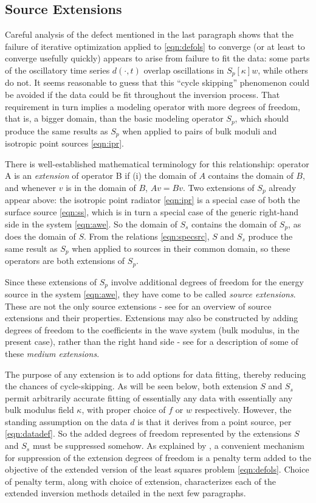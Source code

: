 \subsection{Source Extensions}

Careful analysis of the defect mentioned in the last paragraph shows
that the failure of iterative optimization applied to \ref{eqn:defols}
to converge (or at least to converge usefully quickly) appears to
arise from failure to fit the data: some parts of the oscillatory time
series $d(\cdot,t)$ overlap oscillations in $S_p[\kappa]w$, while
others do not. It seems reasonable to guess that this ``cycle skipping'' phenomenon 
could be avoided if the data could be fit throughout the inversion
process. That requirement in turn implies a modeling operator with
more degrees of freedom, that is, a bigger domain, than the basic
modeling operator $S_p$, which should produce the same results as
$S_p$ when applied to pairs of bulk moduli and isotropic point sources \ref{eqn:ipr}.

There is
well-established mathematical terminology for this relationship:
operator A is an {\em extension} of operator B if (i) the domain of $A$
contains the domain of $B$, and whenever $v$ is in the domain of $B$,
$Av = Bv$. Two extensions of $S_p$ already appear
above: the isotropic point radiator \ref{eqn:ipr} is a special case of
both the surface source \ref{eqn:ss}, which is in turn a special case
of the generic right-hand side in the system \ref{eqn:awe}. So the
domain of $S_s$ contains the domain of $S_p$, as does the domain of
$S$. From the relations \ref{eqn:specsrc}, $S$ and $S_s$ produce the
same result as $S_p$ when applied to sources in their common domain,
so these operators are both extensions of $S_p$.

Since these extensions of $S_p$ involve additional degrees of freedom
for the energy source in the system \ref{eqn:awe}, they have come to
be called {\em source extensions}. These are not the only source
extensions - see \cite{HuangNammourSymesDollizal:SEG19} for an
overview of source extensions and their properties. Extensions may
also be constructed by adding degrees of freedom to the coefficients
in the wave system (bulk modulus, in the present case), 
rather than the right hand side - see \cite{geoprosp:2008} for a
description of some of these {\em medium extensions}.

The purpose of any extension is to add options for data fitting,
thereby reducing the chances of cycle-skipping. As will be seen below,
both extension $S$ and $S_s$ permit arbitrarily accurate fitting of
essentially any data with essentially any bulk modulus field $\kappa$,
with proper choice of $f$ or $w$ respectively. However, the standing
assumption on the data $d$ is that it derives from a point source, per
\ref{eqn:datadef}. So the added degrees of freedom represented by the
extensions $S$ and $S_s$ must be suppressed somehow. As explained by
\cite{geoprosp:2008}, a convenient mechanism for suppression of the
extension degrees of freedom is a penalty term added to the objective
of the extended
version of the least squares problem \ref{eqn:defols}. Choice of penalty
term, along with choice of extension, characterizes each of the extended
inversion methods detailed in the next few paragraphs.

